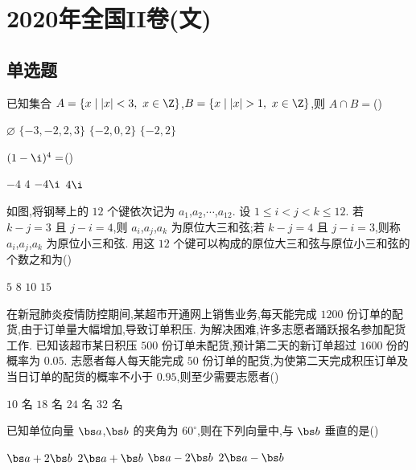 \chapter{2020年全国II卷(文)}

\section{单选题}

\begin{problem}
已知集合 \(A=\{x\mid \lvert x\rvert<3,\ x\in \Z\}\),\(B=\{x\mid \lvert x\rvert>1,\ x\in \Z\}\),则 \(A\cap B=\)(\quad)

\choices
    {\(\varnothing\)}
    {\(\{-3,-2,2,3\}\)}
    {\(\{-2,0,2\}\)}
    {\(\{-2,2\}\)}
\end{problem}

\begin{problem}
\((1-\i)^4=\)(\quad)

\choices
    {\(-4\)}
    {\(4\)}
    {\(-4\i\)}
    {\(4\i\)}
\end{problem}

\begin{problem}
如图,将钢琴上的 \(12\) 个键依次记为 \(a_1\),\(a_2\),\(\cdots\),\(a_{12}\). 设 \(1\le i<j<k\le 12\). 若 \(k-j=3\) 且 \(j-i=4\),则 \(a_i\),\(a_j\),\(a_k\) 为原位大三和弦;若 \(k-j=4\) 且 \(j-i=3\),则称 \(a_i\),\(a_j\),\(a_k\) 为原位小三和弦. 用这 \(12\) 个键可以构成的原位大三和弦与原位小三和弦的个数之和为(\quad)


\choices
    {\(5\)}
    {\(8\)}
    {\(10\)}
    {\(15\)}
\end{problem}

\begin{problem}
在新冠肺炎疫情防控期间,某超市开通网上销售业务,每天能完成 \(1200\) 份订单的配货,由于订单量大幅增加,导致订单积压. 为解决困难,许多志愿者踊跃报名参加配货工作. 已知该超市某日积压 \(500\) 份订单未配货,预计第二天的新订单超过 \(1600\) 份的概率为 \(0.05\). 志愿者每人每天能完成 \(50\) 份订单的配货,为使第二天完成积压订单及当日订单的配货的概率不小于 \(0.95\),则至少需要志愿者(\quad)

\choices
    {\(10\text{ 名}\)}
    {\(18\text{ 名}\)}
    {\(24\text{ 名}\)}
    {\(32\text{ 名}\)}
\end{problem}

\begin{problem}
已知单位向量 \(\bs a\),\(\bs b\) 的夹角为 \(60^\circ\),则在下列向量中,与 \(\bs b\) 垂直的是(\quad)

\choices
    {\(\bs a+2\bs b\)}
    {\(2\bs a+\bs b\)}
    {\(\bs a-2\bs b\)}
    {\(2\bs a-\bs b\)}
\end{problem}

